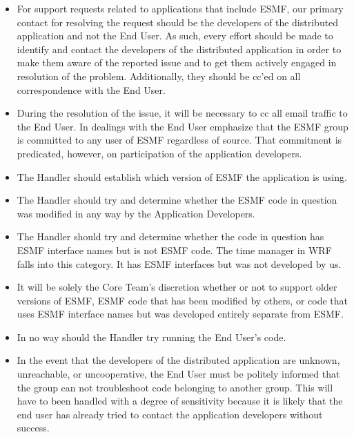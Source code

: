 \begin{itemize}
\item For support requests related to applications that include ESMF,  our primary contact 
for resolving the request should be the developers of the distributed application and not 
the End User.  As such, every effort should be made to identify and contact the developers 
of the distributed application in order to make them aware of the reported issue and to get 
them actively engaged in resolution of the problem. Additionally, they should be cc'ed on 
all correspondence with the End User.
\item During the resolution of the issue, it will be necessary to cc all email traffic to the 
End User.  In dealings with the End User emphasize that the ESMF group is committed to any user 
of ESMF regardless of source. That commitment is predicated, however, on participation of the 
application developers.
\item The Handler should establish which version of ESMF the application is using.   
\item The Handler should try and determine whether the ESMF code in question was modified in any 
way by the Application Developers. 
\item The Handler should try and determine whether the code in question has ESMF interface names 
but is not ESMF code. The time manager in WRF falls into this category. It has ESMF interfaces 
but was not developed by us.  
\item It will be solely the Core Team's discretion whether or not to support older versions of ESMF, 
ESMF code that has been modified by others, or code that uses ESMF interface names but was developed 
entirely separate from ESMF.
\item In no way should the Handler try running the End User's code.
\item In the event that the developers of the distributed application are 
unknown, unreachable, or uncooperative, the End User must be politely informed that the group 
can not troubleshoot code belonging to another group. This will have to been handled with a 
degree of sensitivity because it is likely that the end user has already tried to contact the 
application developers without success. 
\end{itemize}

